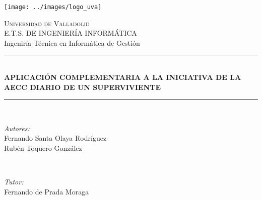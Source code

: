 \documentclass[./pfc.tex]{subfiles}
\begin{document}
	
	\begin{titlepage}
		
		\newcommand{\HRule}{\rule{\linewidth}{0.5mm}} %
		
		\center %
		\texttt{[image: ../images/logo\_uva]}
		
		\textsc{\Large Universidad de Valladolid}\\[1.5cm] %
		\textsc{\LARGE E.T.S. DE INGENIERÍA INFORMÁTICA}\\[0.5cm] %
		\LARGE Ingeniría Técnica en Informática de Gestión\\[0.5cm] %
		
		
		\HRule \\[0.4cm]
		{ \LARGE \bfseries APLICACIÓN COMPLEMENTARIA A LA INICIATIVA DE LA AECC DIARIO DE UN SUPERVIVIENTE}\\[0.2cm] %
		\HRule \\[1.5cm]
		
		
		\begin{minipage}{0.5\textwidth}
			\begin{flushleft} \large
				\emph{Autores:}\\
				Fernando Santa Olaya Rodríguez\\ %
				Rubén Toquero González
			\end{flushleft}
		\end{minipage}
		~
		\begin{minipage}{0.4\textwidth}
			\begin{flushright} \large
				\emph{Tutor:} \\
				Fernando de Prada Moraga %
			\end{flushright}
		\end{minipage}\\[4cm]
		

\end{titlepage}
\end{document}
